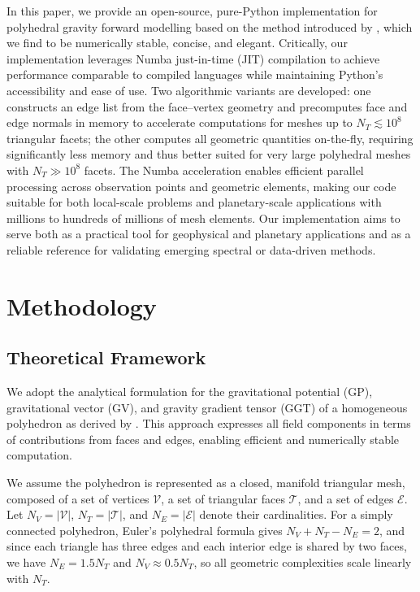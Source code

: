 \documentclass{seg}
\begin{document}
In this paper, we provide an open-source, pure-Python implementation for polyhedral gravity forward modelling based on the method introduced by \citet{Werner1996CelestialMechDynAstr}, which we find to be numerically stable, concise, and elegant. Critically, our implementation leverages Numba just-in-time (JIT) compilation to achieve performance comparable to compiled languages while maintaining Python's accessibility and ease of use. Two algorithmic variants are developed: one constructs an edge list from the face--vertex geometry and precomputes face and edge normals in memory to accelerate computations for meshes up to $N_T \lesssim 10^8$ triangular facets; the other computes all geometric quantities on-the-fly, requiring significantly less memory and thus better suited for very large polyhedral meshes with $N_T \gg 10^8$ facets. The Numba acceleration enables efficient parallel processing across observation points and geometric elements, making our code suitable for both local-scale problems and planetary-scale applications with millions to hundreds of millions of mesh elements. Our implementation aims to serve both as a practical tool for geophysical and planetary applications and as a reliable reference for validating emerging spectral or data-driven \citep{Martin2022CelestMechDynAstron} methods.


\section*{Methodology}

\subsection*{Theoretical Framework}

We adopt the analytical formulation for the gravitational potential (GP), gravitational vector (GV), and gravity gradient tensor (GGT) of a homogeneous polyhedron as derived by \citet{Werner1996CelestialMechDynAstr}. This approach expresses all field components in terms of contributions from faces and edges, enabling efficient and numerically stable computation.

We assume the polyhedron is represented as a closed, manifold triangular mesh, composed of a set of vertices $\mathcal{V}$, a set of triangular faces $\mathcal{T}$, and a set of edges $\mathcal{E}$. Let $N_V = |\mathcal{V}|$, $N_T = |\mathcal{T}|$, and $N_E = |\mathcal{E}|$ denote their cardinalities. For a simply connected polyhedron, Euler's polyhedral formula gives $N_V + N_T - N_E = 2$, and since each triangle has three edges and each interior edge is shared by two faces, we have $N_E=1.5 N_T$ and $N_V \approx 0.5 N_T$, so all geometric complexities scale linearly with $N_T$.
\end{document}
